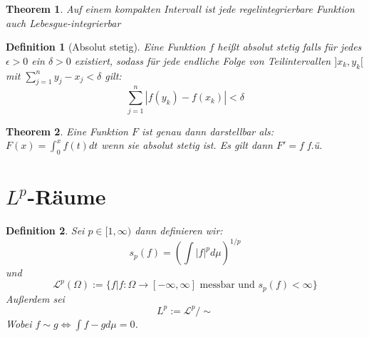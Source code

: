 \documentclass[10pt,a4paper]{article}
\newtheorem{theorem}{Theorem}
\newtheorem{definition}{Definition}
\begin{document}
\begin{theorem}
	Auf einem kompakten Intervall ist jede regelintegrierbare Funktion auch Lebesgue-integrierbar
\end{theorem}
\begin{definition}[Absolut stetig]
	Eine Funktion $f$ heißt absolut stetig falls für jedes $\epsilon > 0$ ein $\delta > 0$ existiert, sodass für jede endliche Folge von Teilintervallen $]x_k, y_k[$ mit $\sum_{j=1}^{n}y_j-x_j < \delta$ gilt:
	$$\sum_{j=1}^{n}|f(y_k)-f(x_k)| < \delta$$
\end{definition}
\begin{theorem}
	Eine Funktion $F$ ist genau dann darstellbar als: $F(x) = \int_{0}^{x}f(t)dt$ wenn sie absolut stetig ist. Es gilt dann $F' = f$ f.ü.
\end{theorem}
\section{$L^p$-Räume}
\begin{definition}
	Sei $p \in [1, \infty)$ dann definieren wir:
	$$s_p(f) = (\int |f|^p d\mu)^{1/p}$$
	und 
	$$\mathcal{L}^p(\Omega) := \{f | f: \Omega \to [-\infty, \infty] \text{ messbar und } s_p(f)<\infty\}$$
	Außerdem sei $$L^p := \mathcal{L}^p/\sim$$ Wobei $f\sim g \iff \int f-g d\mu = 0$.
\end{definition}
\end{document}
